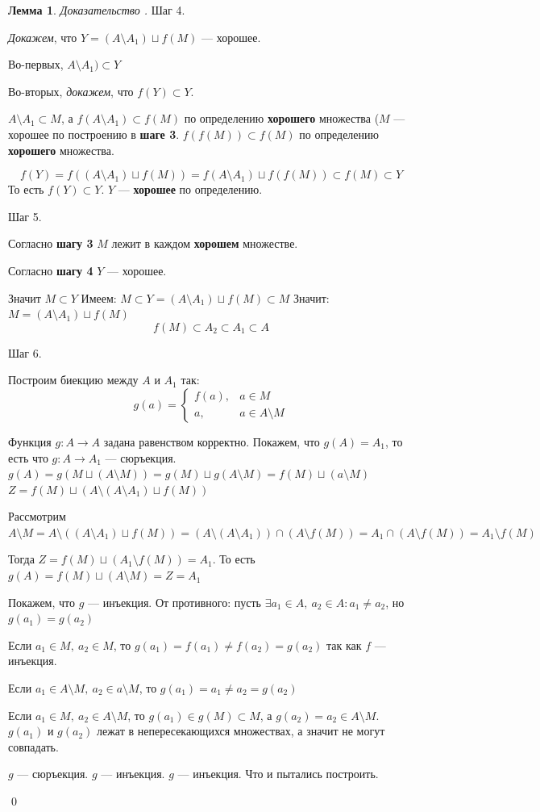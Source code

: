 \documentclass[12pt,oneside]{article}
\theoremstyle{definition}
\newtheorem{lemma}{Лемма}[section]
\newenvironment{ourproof}[1]{\textit{Доказательство #1.}}{\qed}
\begin{document}
\begin{lemma}
\begin{ourproof}{}
Шаг 4.

\textit{Докажем}, что $Y = (A\setminus A_1)\sqcup f(M)$ --- хорошее.

Во-первых, $A\setminus A_1)\subset Y$\checkmark

Во-вторых, \textit{докажем}, что $f(Y)\subset Y$.

$A\setminus A_1\subset M$, а $f(A\setminus A_1) \subset f(M)$ по определению \textbf{хорошего} множества ($M$ --- хорошее по построению в \textbf{шаге 3}.
$f(f(M))\subset f(M)$ по определению \textbf{хорошего} множества.

$$f(Y)=f((A\setminus A_1)\sqcup f(M)) = f(A\setminus A_1)\sqcup f(f(M)) \subset f(M)\subset Y$$
То есть $f(Y)\subset Y$. $Y$ --- \textbf{хорошее} по определению.\checkmark

Шаг 5.

Согласно \textbf{шагу 3} $M$ лежит в каждом \textbf{хорошем} множестве.

Согласно \textbf{шагу 4} $Y$ --- хорошее.

Значит $M\subset Y$
\newline
Имеем: $M\subset Y = (A\setminus A_1)\sqcup f(M) \subset M$
\newline
Значит: $M=(A\setminus A_1)\sqcup f(M)$
$$f(M)\subset A_2 \subset A_1 \subset A$$

Шаг 6.

Построим биекцию между $A$ и $A_1$ так:
$$g(a) = 
\begin{cases}
f(a), & a\in M\\
a, & a\in A\setminus M
\end{cases}$$

Функция $g : A \longrightarrow A$ задана равенством корректно. Покажем, что $g(A)=A_1$, то есть что $g : A \longrightarrow A_1$ --- сюръекция.
\newline
$g(A)=g(M\sqcup(A\setminus M))=g(M)\sqcup g(A\setminus M) = f(M)\sqcup (a\setminus M)$
\newline
$Z = f(M)\sqcup (A\setminus(A\setminus A_1)\sqcup f(M))$

Рассмотрим $A\setminus M = A\setminus ((A\setminus A_1)\sqcup f(M)) = (A\setminus(A\setminus A_1))\cap (A\setminus f(M)) = A_1 \cap (A\setminus f(M)) = A_1\setminus f(M)$

Тогда $Z = f(M)\sqcup (A_1\setminus f(M)) = A_1$. То есть $g(A)=f(M)\sqcup(A\setminus M) = Z = A_1$

Покажем, что $g$ --- инъекция. От противного: пусть $\exists a_1\in A,\ a_2\in A: a_1\neq a_2$, но $g(a_1)=g(a_2)$

Если $a_1\in M,\ a_2\in M$, то $g(a_1)=f(a_1)\neq f(a_2)=g(a_2)$ так как $f$ --- инъекция.\checkmark

Если $a_1\in A\setminus M,\ a_2\in a\setminus M$, то $g(a_1)=a_1\neq a_2=g(a_2)$\checkmark

Если $a_1\in M,\ a_2\in A\setminus M$, то $g(a_1)\in g(M)\subset M$, а $g(a_2)=a_2\in A\setminus M$. $g(a_1)$ и $g(a_2)$ лежат в непересекающихся множествах, а значит не могут совпадать.\checkmark

$g$ --- сюръекция. $g$ --- инъекция. $g$ --- инъекция. Что и пытались построить.

\end{ourproof}
\end{lemma}
\end{document}
